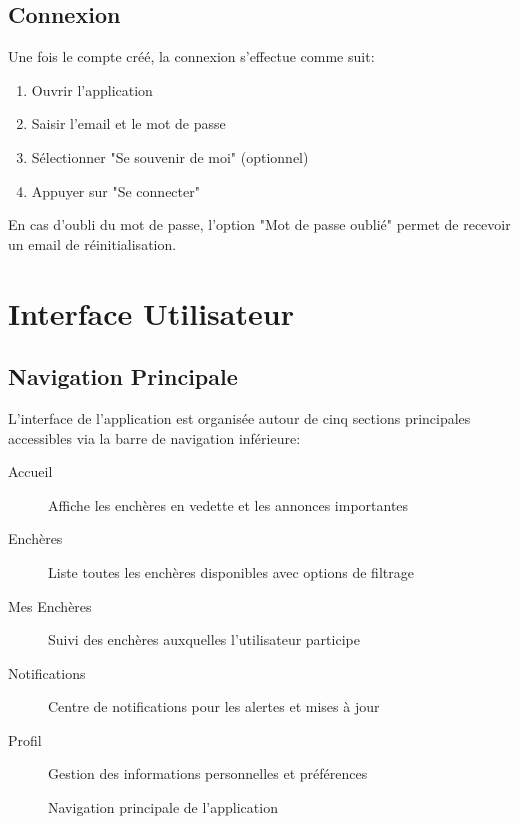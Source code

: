 \subsection{Connexion}

Une fois le compte créé, la connexion s'effectue comme suit:

\begin{enumerate}
    \item Ouvrir l'application
    \item Saisir l'email et le mot de passe
    \item Sélectionner "Se souvenir de moi" (optionnel)
    \item Appuyer sur "Se connecter"
\end{enumerate}

En cas d'oubli du mot de passe, l'option "Mot de passe oublié" permet de recevoir un email de réinitialisation.

\section{Interface Utilisateur}

\subsection{Navigation Principale}

L'interface de l'application est organisée autour de cinq sections principales accessibles via la barre de navigation inférieure:

\begin{description}
    \item[Accueil] Affiche les enchères en vedette et les annonces importantes
    \item[Enchères] Liste toutes les enchères disponibles avec options de filtrage
    \item[Mes Enchères] Suivi des enchères auxquelles l'utilisateur participe
    \item[Notifications] Centre de notifications pour les alertes et mises à jour
    \item[Profil] Gestion des informations personnelles et préférences
\end{description}

\begin{figure}[h]
    \centering
    \caption{Navigation principale de l'application}
    \label{fig:nav-principale}
\end{figure}


